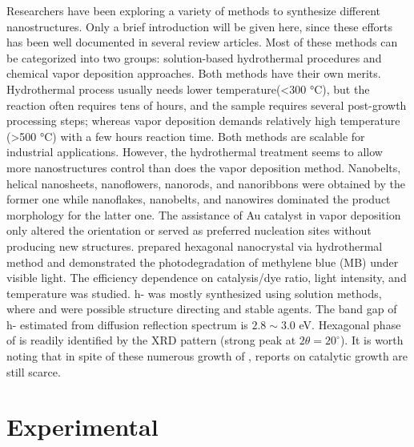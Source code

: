 Researchers have been exploring a variety of methods to synthesize different  nanostructures. Only a brief introduction will be given here, since these efforts has been well documented in several review articles.\cite{He2003} Most of these methods can be categorized into two groups: solution-based hydrothermal procedures \citep{Li2002b,Xia2006,Li2006a,Camacho-Bragado2006} and chemical vapor deposition approaches.\citep{Zeng1998,Li2002c,Li2002d,Zhou2003b,Fibers2007,Yan2009} Both methods have their own merits. Hydrothermal process usually needs lower temperature(\textless 300 \si{\degreeCelsius}), but the reaction often requires tens of hours, and the sample requires several post-growth processing steps; whereas vapor deposition demands relatively high temperature (\textgreater 500 \si{\degreeCelsius}) with a few hours reaction time. Both methods are scalable for industrial applications. However, the hydrothermal treatment seems to allow more  nanostructures control than does the vapor deposition method. Nanobelts,\cite{Li2002b} helical nanosheets, nanoflowers, nanorods,\cite{Li2006a} and nanoribbons\cite{Camacho-Bragado2006} were obtained by the former one while nanoflakes,\cite{Chen2009} nanobelts,\cite{Hu2009} and nanowires\citep{Zhou2003b,Chen2011b} dominated the product morphology for the latter one. The assistance of Au catalyst in vapor deposition only altered the orientation\cite{Yan2009} or served as preferred nucleation sites\cite{Cai2011} without producing new  structures. \citeauthor{Chithambararaj2013} prepared hexagonal  nanocrystal via hydrothermal method and demonstrated the photodegradation of methylene blue (MB) under visible light.\cite{Chithambararaj2013} The efficiency dependence on catalysis/dye ratio, light intensity, and temperature was studied. h- was mostly synthesized using solution methods, where  and  were possible structure directing and stable agents. The band gap of h- estimated from diffusion reflection spectrum is $2.8\sim3.0$ eV. Hexagonal phase of  is readily identified by the XRD pattern (strong peak at $2\theta=20^{\circ}$). It is worth noting that in spite of these numerous growth of , reports on catalytic growth are still scarce. 

\section{Experimental}\label{sec:grow}

